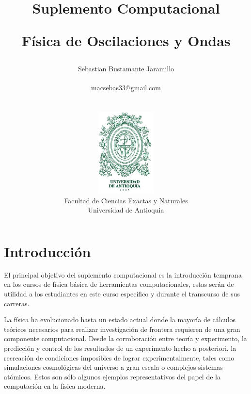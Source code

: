 \documentclass[12pt]{book}
\begin{document}
\title{Suplemento Computacional \\
\begin{Huge}
\textbf{Física de Oscilaciones y Ondas}
\end{Huge}}
\author{ Sebastian Bustamante Jaramillo\\ \begin{small}
macsebas33@gmail.com
\end{small} \\ \vspace{5cm} \\
\includegraphics[width=3cm]{UdeA_Shield} \\
Facultad de Ciencias Exactas y Naturales \\ 
Universidad de Antioquia }
\date{}

\maketitle


\newpage{\pagestyle{empty}\cleardoublepage}  

\tableofcontents
\newpage{\pagestyle{empty}\cleardoublepage}  

\chapter{Introducción}

El principal objetivo del suplemento computacional es la introducción temprana en los 
cursos de física básica de herramientas computacionales, estas serán de utilidad a los 
estudiantes en este curso específico y durante el transcurso de sus carreras.


La física ha evolucionado hasta un estado actual donde la mayoría de cálculos teóricos 
necesarios para realizar investigación de frontera requieren de una gran componente 
computacional. Desde la corroboración entre teoría y experimento, la predicción y control 
de los resultados de un experimento hecho a posteriori, la recreación de condiciones 
imposibles de lograr experimentalmente, tales como simulaciones cosmológicas del universo 
a gran escala o complejos sistemas atómicos. Estos son sólo algunos ejemplos 
representativos del papel de la computación en la física moderna.
\end{document}
